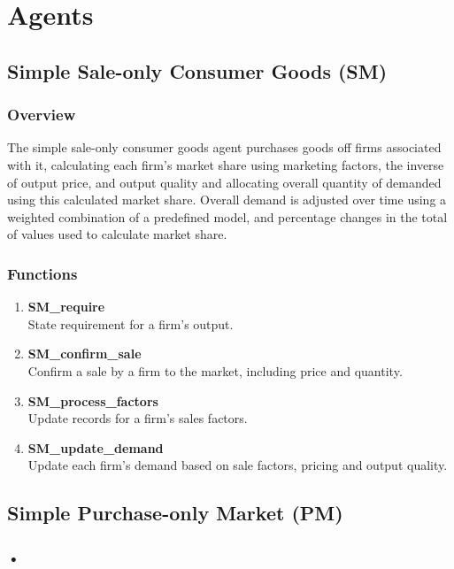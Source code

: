 \documentclass[11pt]{article}
\begin{document}
\tableofcontents

\section{Agents}

\subsection{Simple Sale-only Consumer Goods (SM)}

\subsubsection{Overview}
The simple sale-only consumer goods agent purchases goods off firms associated with it, calculating each firm's market share using marketing factors, the inverse of output price, and output quality and allocating overall quantity of demanded using this calculated market share. Overall demand is adjusted over time using a weighted combination of a predefined model, and percentage changes in the total of values used to calculate market share.

\subsubsection{Functions}
\begin{enumerate}
	\item \textbf{SM\_require} \\
	State requirement for a firm's output.
	\item \textbf{SM\_confirm\_sale} \\
	Confirm a sale by a firm to the market, including price and quantity.
	\item \textbf{SM\_process\_factors} \\
	Update records for a firm's sales factors.
	\item \textbf{SM\_update\_demand} \\
	Update each firm's demand based on sale factors, pricing and output quality.
\end{enumerate}

\subsection{Simple Purchase-only Market (PM)}

\subsubsection{•}
\end{document}
